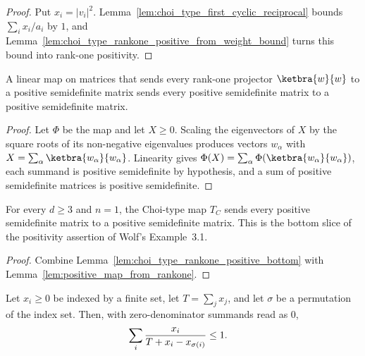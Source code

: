 \begin{proof}
    \leanok
    Put $x_i=|v_i|^2$. Lemma~\ref{lem:choi_type_first_cyclic_reciprocal}
    bounds $\sum_i x_i/a_i$ by $1$, and
    Lemma~\ref{lem:choi_type_rankone_positive_from_weight_bound} turns this
    bound into rank-one positivity.
\end{proof}

\begin{lemma}
    \label{lem:positive_map_from_rankone}
    \leanok
    A linear map on matrices that sends every rank-one projector
    $\ketbra{w}{w}$ to a positive semidefinite matrix sends every positive
    semidefinite matrix to a positive semidefinite matrix.
\end{lemma}

\begin{proof}
    \leanok
    Let $\Phi$ be the map and let $X\ge0$. Scaling the eigenvectors of $X$ by
    the square roots of its non-negative eigenvalues produces vectors
    $w_\alpha$ with $X=\sum_\alpha \ketbra{w_\alpha}{w_\alpha}$.
    Linearity gives
    $\Phi(X)=\sum_\alpha \Phi(\ketbra{w_\alpha}{w_\alpha})$, each summand is
    positive semidefinite by hypothesis, and a sum of positive semidefinite
    matrices is positive semidefinite.
\end{proof}

\begin{theorem}
    \label{thm:choi_type_positive_bottom}
    \leanok
    For every $d\ge3$ and $n=1$, the Choi-type map $T_C$ sends every positive
    semidefinite matrix to a positive semidefinite matrix. This is the bottom
    slice of the positivity assertion of Wolf's Example~3.1.
\end{theorem}

\begin{proof}
    \leanok
    Combine Lemma~\ref{lem:choi_type_rankone_positive_bottom} with
    Lemma~\ref{lem:positive_map_from_rankone}.
\end{proof}

\begin{lemma}
    \label{lem:choi_type_perm_reciprocal}
    \leanok
    Let $x_i\ge0$ be indexed by a finite set, let $T=\sum_j x_j$, and let
    $\sigma$ be a permutation of the index set. Then, with zero-denominator
    summands read as $0$,
    \begin{align}
        \sum_i \frac{x_i}{T+x_i-x_{\sigma(i)}}
         & \le 1.
        \notag
    \end{align}
\end{lemma}

